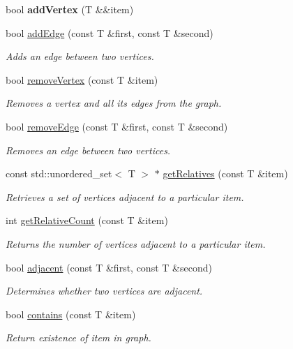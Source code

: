 \begin{DoxyCompactItemize}
bool {\bfseries add\+Vertex} (T \&\&item)
\item 
bool \hyperlink{class_graph_ae68a4a6bcb5dacf54f389ec9f28eb9e7}{add\+Edge} (const T \&first, const T \&second)
\begin{DoxyCompactList}\small\item\em Adds an edge between two vertices. \end{DoxyCompactList}\item 
bool \hyperlink{class_graph_ab60cdf74dfbd8c7682b760338fb8a952}{remove\+Vertex} (const T \&item)
\begin{DoxyCompactList}\small\item\em Removes a vertex and all its edges from the graph. \end{DoxyCompactList}\item 
bool \hyperlink{class_graph_afec0f8270f77a9b54f6528a4e7182c84}{remove\+Edge} (const T \&first, const T \&second)
\begin{DoxyCompactList}\small\item\em Removes an edge between two vertices. \end{DoxyCompactList}\item 
const std\+::unordered\+\_\+set$<$ T $>$ $\ast$ \hyperlink{class_graph_add90c1bc37771d0bf57515fd30d4c6c4}{get\+Relatives} (const T \&item)
\begin{DoxyCompactList}\small\item\em Retrieves a set of vertices adjacent to a particular item. \end{DoxyCompactList}\item 
int \hyperlink{class_graph_aaab69d9804f13918c7fe260b86a40d91}{get\+Relative\+Count} (const T \&item)
\begin{DoxyCompactList}\small\item\em Returns the number of vertices adjacent to a particular item. \end{DoxyCompactList}\item 
bool \hyperlink{class_graph_adb8fbcba5e10315bba9e60080d4bac50}{adjacent} (const T \&first, const T \&second)
\begin{DoxyCompactList}\small\item\em Determines whether two vertices are adjacent. \end{DoxyCompactList}\item 
bool \hyperlink{class_graph_a9e88e1fec0b85da66ea58a39a4fdc652}{contains} (const T \&item)
\begin{DoxyCompactList}\small\item\em Return existence of item in graph. \end{DoxyCompactList}\item 

\end{DoxyCompactItemize}
